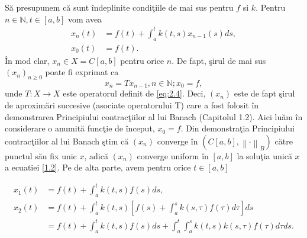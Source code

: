 \documentclass[a4paper,12pt,oneside]{report}
\begin{document}
S\u{a} presupunem c\u{a} sunt \^{i}ndeplinite condi\c{t}iile de mai sus pentru \(f\) si \(k\). Pentru \(n\in \mathbb{N}, t\in \left [ a,b \right ]\) vom avea
\begin{equation} \nonumber
\begin{split}
x_{n}\left ( t \right ) &= f\left ( t \right ) + \int_{a}^{t}k\left ( t,s \right )x_{n-1}\left ( s \right )ds, \\
x_{0}\left ( t \right ) &= f\left ( t \right ).
\end{split}
\end{equation}
\^{I}n mod clar, \(x_{n} \in X = C\left [ a,b \right ]\) pentru orice \(n\). De fapt, \c{s}irul de mai sus \(\left ( x_{n} \right )_{n\geq 0}\) poate fi exprimat ca
\begin{displaymath}
x_{n} = Tx_{n-1}, n\in \mathbb{N}; x_{0} = f,
\end{displaymath}
unde \(T : X \rightarrow X\) este operatorul definit de \ref{eq:2.4}. Deci, \(\left (x_{n}  \right )\) este de fapt \c{s}irul de aproxim\u{a}ri succesive (asociate operatorului T) care a fost folosit \^{i}n demonstrarea Principiului contrac\c{t}iilor al lui Banach (Capitolul 1.2). Aici lu\u{a}m \^{i}n considerare o anumit\u{a} func\c{t}ie de \^{i}nceput, \(x_{0} = f\). Din demonstra\c{t}ia Principiului contrac\c{t}iilor al lui Banach \c{s}tim c\u{a} \(\left ( x_{n} \right )\) converge \^{i}n \(\left ( C\left [ a,b \right ], \left \| \cdot  \right \|_{B} \right )\) c\u{a}tre punctul s\u{a}u fix unic \(x\), adic\u{a} \(\left ( x_{n} \right )\) converge uniform \^{i}n \(\left [ a,b \right ]\) la solu\c{t}ia unic\u{a} \(x\) a ecuatiei \ref{1.2}. Pe de alta parte, avem pentru orice \(t\in \left [ a,b \right ]\)

\begin{equation} \nonumber
    \begin{split}
        x_{1}\left ( t \right ) &= f\left ( t \right ) + \int_{a}^{t}k\left ( t,s \right )f\left ( s \right )ds, \\
        x_{2}\left ( t \right ) &  = f\left ( t \right ) + \int_{a}^{t}k\left ( t,s \right )\left [ f\left ( s \right ) + \int_{a}^{s} k\left ( s,  \tau  \right )f\left (\tau  \right )d\tau  \right ]ds \\
        & =  f\left ( t \right ) + \int_{a}^{t}k\left ( t,s \right )f\left ( s \right )ds + \int_{a}^{t}\int_{a}^{s}k\left ( t,s \right )k\left ( s,\tau  \right )f\left (\tau  \right ) d\tau ds.
    \end{split}
\end{equation}
\end{document}
